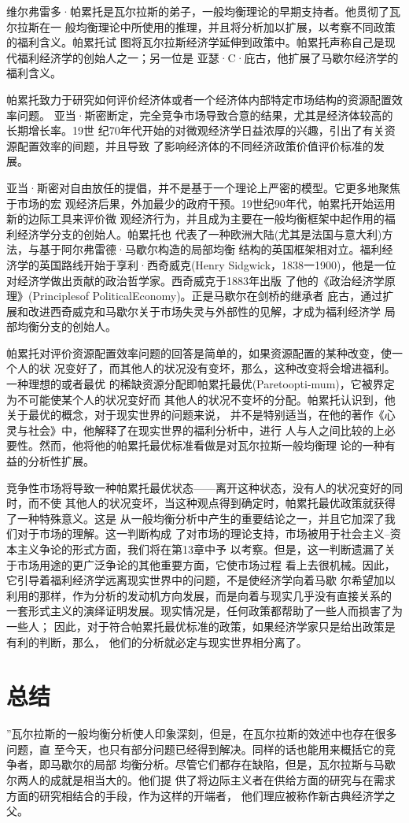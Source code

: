 维尔弗雷多·帕累托是瓦尔拉斯的弟子，一般均衡理论的早期支持者。他贯彻了瓦尔拉斯在一
般均衡理论中所使用的推理，并且将分析加以扩展，以考察不同政策的福利含义。帕累托试
图将瓦尔拉斯经济学延伸到政策中。帕累托声称自己是现代福利经济学的创始人之一；另一位是
亚瑟·C·庇古，他扩展了马歇尔经济学的福利含义。

帕累托致力于研究如何评价经济体或者一个经济体内部特定市场结构的资源配置效率问题。
亚当·斯密断定，完全竞争市场导致合意的结果，尤其是经济体较高的长期增长率。19世
纪70年代开始的对微观经济学日益浓厚的兴趣，引出了有关资源配置效率的间题，并且导致
了影响经济体的不同经济政策价值评价标准的发展。

亚当·斯密对自由放任的提倡，并不是基于一个理论上严密的模型。它更多地聚焦于市场的宏
观经济后果，外加最少的政府干预。19世纪90年代，帕累托开始运用新的边际工具来评价微
观经济行为，并且成为主要在一般均衡框架中起作用的福利经济学分支的创始人。帕累托也
代表了一种欧洲大陆(尤其是法国与意大利)方法，与基于阿尔弗雷德·马歇尔构造的局部均衡
结构的英国框架相对立。福利经济学的英国路线开始于享利·西奇威克(Henry
Sidgwick，1838一1900)，他是一位对经济学做出贡献的政治哲学家。西奇威克于1883年出版
了他的《政治经济学原理》(Principlesof PoliticalEconomy)。正是马歇尔在剑桥的继承者
庇古，通过扩展和改进西奇威克和马歇尔关于市场失灵与外部性的见解，才成为福利经济学
局部均衡分支的创始人。

帕累托对评价资源配置效率问题的回答是简单的，如果资源配置的某种改变，使一个人的状
况变好了，而其他人的状况没有变坏，那么，这种改变将会增进福利。一种理想的或者最优
的稀缺资源分配即帕累托最优(Paretoopti-mum)，它被界定为不可能使某个人的状况变好而
其他人的状况不变坏的分配。帕累托认识到，他关于最优的概念，对于现实世界的问题来说，
并不是特别适当，在他的著作《心灵与社会》中，他解释了在现实世界的福利分析中，进行
人与人之间比较的上必要性。然而，他将他的帕累托最优标准看做是对瓦尔拉斯一般均衡理
论的一种有益的分析性扩展。

竞争性市场将导致一种帕累托最优状态——离开这种状态，没有人的状况变好的同时，而不使
其他人的状况变坏，当这种观点得到确定时，帕累托最优政策就获得了一种特殊意义。这是
从一般均衡分析中产生的重要结论之一，并且它加深了我们对于市场的理解。这一判断构成
了对市场的理论支持，市场被用于社会主义--资本主义争论的形式方面，我们将在第13章中予
以考察。但是，这一判断遗漏了关于市场用途的更广泛争论的其他重要方面，它使市场过程
看上去很机械。因此，它引导着福利经济学远离现实世界中的问题，不是使经济学向着马歇
尔希望加以利用的那样，作为分析的发动机方向发展，而是向着与现实几乎没有直接关系的
一套形式主义的演绎证明发展。现实情况是，任何政策都帮助了一些人而损害了为一些人；
因此，对于符合帕累托最优标准的政策，如果经济学家只是给出政策是有利的判断，那么，
他们的分析就必定与现实世界相分离了。

\section{总结}

”瓦尔拉斯的一般均衡分析使人印象深刻，但是，在瓦尔拉斯的效述中也存在很多问题，直
至今天，也只有部分问题已经得到解决。同样的话也能用来概括它的竞争者，即马歇尔的局部
均衡分析。尽管它们都存在缺陷，但是，瓦尔拉斯与马歇尔两人的成就是相当大的。他们提
供了将边际主义者在供给方面的研究与在需求方面的研究相结合的手段，作为这样的开端者，
他们理应被称作新古典经济学之父。


